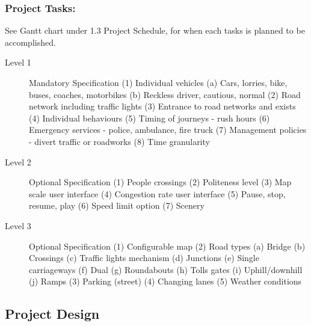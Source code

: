 \documentclass{article} \usepackage{graphicx}
\begin{document}
			\subsubsection{Project Tasks:} 					
			See Gantt chart under 1.3 Project Schedule, for when each tasks is planned to be accomplished.
            \begin{description} 				
                \item[Level 1] Mandatory Specification
                        (1) Individual vehicles
                                (a) Cars, lorries, bike, buses, coaches, motorbikes 					
                                (b) Reckless driver, cautious, normal 								
                        (2) Road network including traffic lights
                        (3) Entrance to road networks and exists
                        (4) Individual behaviours
                        (5) Timing of journeys - rush hours
                        (6) Emergency services - police, ambulance, fire truck
                        (7) Management policies - divert traffic or roadworks
                        (8) Time granularity 						
                        	
                  \item[Level 2] Optional Specification
                            (1) People crossings
                            (2) Politeness level
                            (3) Map scale user interface
                            (4) Congestion rate user interface
                            (5) Pause, stop, resume, play
                            (6) Speed limit option
                            (7) Scenery
                  \item[Level 3] Optional Specification
                        (1) Configurable map
                        (2) Road types
                            (a) Bridge
                            (b) Crossings
                            (c) Traffic lights mechanism
                            (d) Junctions
                            (e) Single carriageways
                            (f) Dual
                            (g) Roundabouts
                            (h) Tolls gates
                            (i) Uphill/downhill
                            (j) Ramps
                        (3) Parking (street)
                        (4) Changing lanes
                        (5) Weather conditions
                \end{description}


                \subsection{Project Design}
              
\end{document}
